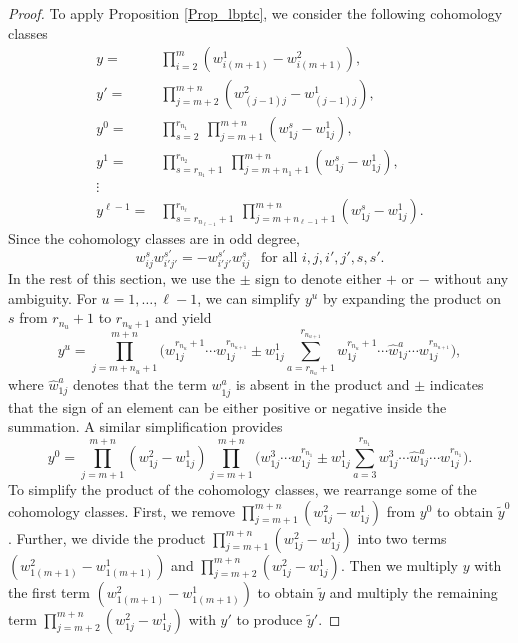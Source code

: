 \documentclass[12pt,oneside,reqno]{amsart}
\theoremstyle{plain}
\theoremstyle{definition}
\theoremstyle{remark}
\begin{document}
\begin{proof}
To apply Proposition \ref{Prop_lbptc}, we consider the following cohomology classes %
\begin{align*}
y = & \prod^m_{i=2}(w^1_{i(m+1)} - w^2_{i(m+1)}),\\
y' = & \prod^{m+n}_{j=m+2} (w^2_{(j-1)j} - w^1_{(j-1)j}),\\
y^0 = & \prod^{r_{n_1}}_{s=2} ~\prod^{m+n}_{j=m+1} (w^s_{1j} - w^1_{1j}),\\
y^1 = & \prod^{r_{n_2}}_{s=r_{n_1}+1} ~\prod^{m+n}_{j=m+ n_1 + 1} (w^s_{1j} - w^1_{1j}),\\
\vdots \\
y^{\ell-1} = & \prod^{r_{n_\ell}}_{s=r_{n_{\ell-1}}+1} ~\prod^{m+n}_{j=m+ n_{\ell-1} + 1} (w^s_{1j} - w^1_{1j}).
\end{align*}
Since the cohomology classes are in odd degree, 
\begin{equation}\label{Eq_anticommutativity}
w^s_{ij} w^{s'}_{i'j'} = - w^{s'}_{i'j'} w^s_{ij} ~~\text{ for all } i,j, i',j',s,s'.
\end{equation}
 In the rest of this section, we use the $\pm$ sign to denote either $+$ or $-$ without any ambiguity.
For $u=1,\ldots, \ell-1$, we can simplify $y^u$ by expanding the product on $s$ from $r_{n_u}+1$ to $r_{n_u+1}$ and yield
\begin{equation*}
  y^u = \prod^{m+n}_{j=m+n_u +1} \Big(w^{r_{n_u} +1}_{1j} \cdots w^{r_{n_{u+1}}}_{1j} \pm w^1_{1j} \sum^{r_{n_{u+1}}}_{a=r_{n_u}+1} w^{r_{n_u} +1}_{1j}\cdots \hat{w}^a_{1j} \cdots w^{r_{n_{u+1}}}_{1j}\Big),  
\end{equation*} 
where $\hat{w}^a_{1j}$ denotes that the term ${w}^a_{1j}$ is absent in the product and $\pm$ indicates that the sign of an element can be either positive or negative inside the summation.
A similar simplification provides $$y^0 = \prod^{m+n}_{j=m+1} (w^2_{1j} - w^1_{1j}) \prod^{m+n}_{j=m+1}\Big(w^3_{1j} \cdots w^{r_{n_1}}_{1j} \pm w^1_{1j} \sum^{r_{n_1}}_{a=3} w^3_{1j} \cdots \hat{w}^a_{1j} \cdots w^{r_{n_1}}_{1j}\Big).$$
To simplify the product of the cohomology classes, we rearrange some of the cohomology classes. First, we remove $\displaystyle\prod^{m+n}_{j=m+1} (w^2_{1j} - w^1_{1j})$ from $y^0$ to obtain $\tilde{y}^0$. Further, we divide the product $\displaystyle\prod^{m+n}_{j=m+1} (w^2_{1j} - w^1_{1j})$ into two terms $(w^2_{1(m+1)} - w^1_{1(m+1)})$ and $\displaystyle\prod^{m+n}_{j=m+2} (w^2_{1j} - w^1_{1j})$. 
Then we multiply $y$ with the first term $(w^2_{1(m+1)} - w^1_{1(m+1)})$ to obtain $\tilde{y}$ and multiply the remaining term $\displaystyle\prod^{m+n}_{j=m+2} (w^2_{1j} - w^1_{1j})$ with $y'$ to produce $\tilde{y}'$. 

\end{proof}
\end{document}

